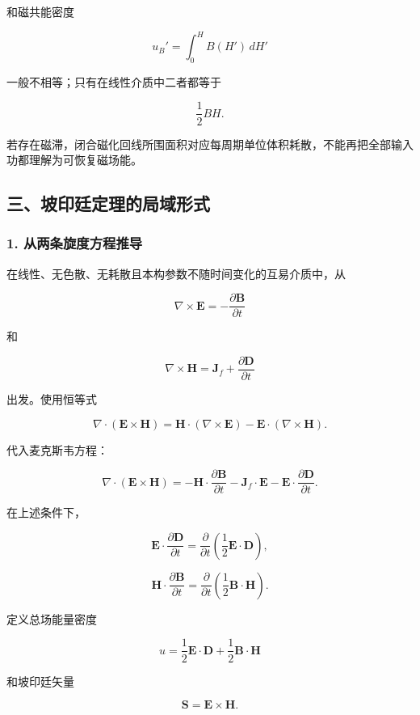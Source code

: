 和磁共能密度

\[
u_B'=\int_0^H B(H')\,dH'
\]

一般不相等；只有在线性介质中二者都等于

\[
\frac12BH.
\]

若存在磁滞，闭合磁化回线所围面积对应每周期单位体积耗散，不能再把全部输入功都理解为可恢复磁场能。

\subsection{三、坡印廷定理的局域形式}\label{m7:ux4e09ux5761ux5370ux5ef7ux5b9aux7406ux7684ux5c40ux57dfux5f62ux5f0f}

\subsubsection{1.
从两条旋度方程推导}\label{m7:ux4eceux4e24ux6761ux65cbux5ea6ux65b9ux7a0bux63a8ux5bfc}

在线性、无色散、无耗散且本构参数不随时间变化的互易介质中，从

\[
\nabla\times\mathbf E
=-\frac{\partial\mathbf B}{\partial t}
\]

和

\[
\nabla\times\mathbf H
=\mathbf J_f+\frac{\partial\mathbf D}{\partial t}
\]

出发。使用恒等式

\[
\nabla\cdot(\mathbf E\times\mathbf H)
=\mathbf H\cdot(\nabla\times\mathbf E)
-\mathbf E\cdot(\nabla\times\mathbf H).
\]

代入麦克斯韦方程：

\[
\nabla\cdot(\mathbf E\times\mathbf H)
=-\mathbf H\cdot\frac{\partial\mathbf B}{\partial t}
-\mathbf J_f\cdot\mathbf E
-\mathbf E\cdot\frac{\partial\mathbf D}{\partial t}.
\]

在上述条件下，

\[
\mathbf E\cdot\frac{\partial\mathbf D}{\partial t}
=\frac{\partial}{\partial t}
\left(\frac12\mathbf E\cdot\mathbf D\right),
\]

\[
\mathbf H\cdot\frac{\partial\mathbf B}{\partial t}
=\frac{\partial}{\partial t}
\left(\frac12\mathbf B\cdot\mathbf H\right).
\]

定义总场能量密度

\[
\boxed{
u=\frac12\mathbf E\cdot\mathbf D
+\frac12\mathbf B\cdot\mathbf H
}
\]

和坡印廷矢量

\[
\boxed{\mathbf S=\mathbf E\times\mathbf H}.
\]

